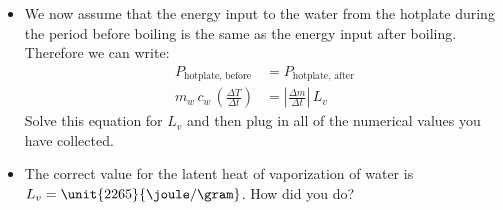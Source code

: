 \begin{itemize}
\begin{enumerate}[label=(\roman*)]
		\item {\bf Conservation of energy after boiling} After full boiling starts, you should have observed that the temperature is almost exactly constant at $100\degree$C. Therefore, no energy being used to raise the temperature of water, since $\Delta T_\text{w} = 0$, and the term with heat capacity will not appear in our equation. Instead, the heat transferred from the hot plate causes only the transition of water from liquid to vapor. This is accounted for by our {\bf latent heat of vaporization equation}
			\begin{equation*}
			\Delta E_\text{input} = \left| \Delta m \right| \, L_v  \quad \rightarrow \quad \frac{\Delta E_\text{input}}{\Delta t} = \frac{\left| \Delta m \right| }{\Delta t}  \, L_v \quad \rightarrow \quad P_\text{hotplate, after} = \left|  \frac{\Delta m }{\Delta t} \right|  \, L_v 
			\end{equation*}
		The first equation states that the energy input from the hotplate in some time interval, $\Delta t$,  causes a mass loss $|\Delta m|$ of liquid water into vapor (the absolute values are because the {\em change} in liquid mass is actually negative).  By dividing that equation by the time interval we have obtained an expression containing our mass graph slope, $\left| \frac{\Delta m}{\Delta t} \right|$.  
		\end{enumerate}
	\item We now assume that the energy input to the water from the hotplate during the period before boiling is the same as the energy input after boiling. Therefore we can write:
		\begin{equation*}
		\begin{split}
		P_\text{hotplate, before} &= P_\text{hotplate, after} \\
		m_w \, c_w \, \left( \frac{\Delta T}{\Delta t} \right) &= \left| \frac{ \Delta m }{\Delta t}  \right| \, L_v 
		\end{split}
		\end{equation*}
	Solve this equation for $L_v$ and then plug in all of the numerical values you have collected.
	\item The correct value for the latent heat of vaporization of water is $L_v=\unit{2265}{\joule / \gram}$.  How did you do?
	\end{itemize}




